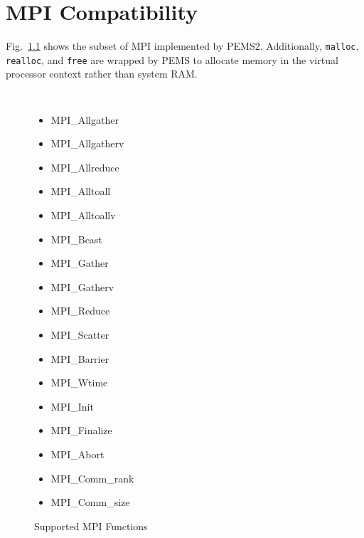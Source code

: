 \documentclass[12pt]{carletoncsthesis}
\begin{document}
 


\chapter{MPI Compatibility}
\thispagestyle{empty}
\label{MPI-funcs}


Fig.~\ref{mpi_functions} shows the subset of MPI implemented by PEMS2.
Additionally, {\tt malloc}, {\tt realloc}, and {\tt free} are wrapped by PEMS
to allocate memory in the virtual processor context rather than system RAM.

\begin{figure}[ht]
\begin{center}
{\tt
\begin{itemize}
	\item MPI\_Allgather
	\item MPI\_Allgatherv
	\item MPI\_Allreduce
	\item MPI\_Alltoall
	\item MPI\_Alltoallv
	\item MPI\_Bcast
	\item MPI\_Gather
	\item MPI\_Gatherv
	\item MPI\_Reduce
	\item MPI\_Scatter
	\item MPI\_Barrier
	\item MPI\_Wtime
	\item MPI\_Init
	\item MPI\_Finalize
	\item MPI\_Abort
	\item MPI\_Comm\_rank
	\item MPI\_Comm\_size
\end{itemize}
}
\end{center}
\caption{Supported MPI Functions}
\label{mpi_functions}
\end{figure}
\end{document}
